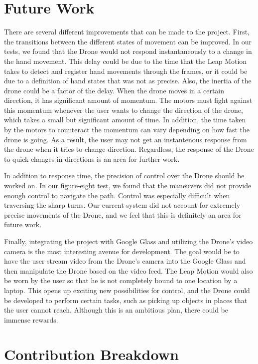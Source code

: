 \documentclass[letterpaper,english, 12pt]{article}
\begin{document}
\section*{Future Work}

There are several different improvements that can be made to the project. First, the transitions between the different states of movement can be improved. In our tests, we found that the Drone would not respond instantaneously to a change in the hand movement. This delay could be due to the time that the Leap Motion takes to detect and register hand movements through the frames, or it could be due to a definition of hand states that was not as precise. Also, the inertia of the drone could be a factor of the delay. When the drone moves in a certain direction, it has significant amount of momentum. The motors must fight against this momentum whenever the user wants to change the direction of the drone, which takes a small but significant amount of time. In addition, the time taken by the motors to counteract the momentum can vary depending on how fast the drone is going. As a result, the user may not get an instantenous response from the drone when it tries to change direction. Regardless, the response of the Drone to quick changes in directions is an area for further work.
	
In addition to response time, the precision of control over the Drone should be worked on. In our figure-eight test, we found that the maneuvers did not provide enough control to navigate the path. Control was especially difficult when traversing the sharp turns. Our current system did not account for extremely precise movements of the Drone, and we feel that this is definitely an area for future work.
	
Finally, integrating the project with Google Glass and utilizing the Drone's video camera is the most interesting avenue for development. The goal would be to have the user stream video from the Drone's camera into the Google Glass and then manipulate the Drone based on the video feed. The Leap Motion would also be worn by the user so that he is not completely bound to one location by a laptop. This opens up exciting new possibilities for control, and the Drone could be developed to perform certain tasks, such as picking up objects in places that the user cannot reach. Although this is an ambitious plan, there could be immense rewards.


\section*{Contribution Breakdown}
\end{document}
